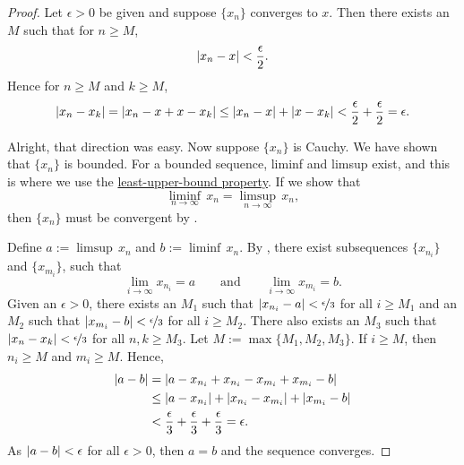 \begin{proof}
Let $\epsilon > 0$ be given and
suppose $\{ x_n \}$ converges to $x$.  Then there 
exists an $M$ such that for $n \geq M$,
\begin{equation*}
\left\lvert {x_n - x} \right\rvert < \frac{\epsilon}{2} .
\end{equation*}
Hence for $n \geq M$ and $k \geq M$,
\begin{equation*}
\left\lvert {x_n - x_k} \right\rvert = 
\left\lvert {x_n - x + x - x_k} \right\rvert
\leq \left\lvert {x_n-x} \right\rvert + \left\lvert {x-x_k} \right\rvert < \frac{\epsilon}{2} + \frac{\epsilon}{2} =
\epsilon .
\end{equation*}

Alright, that direction was easy.  Now suppose $\{ x_n \}$ is Cauchy.
We have shown that $\{ x_n \}$ is bounded.
For a bounded sequence, liminf and limsup exist, and this is
where we use the
\hyperref[defn:lub]{least-upper-bound property}.
If we show that
\begin{equation*}
\liminf_{n\to \infty} \, x_n = \limsup_{n\to\infty} \, x_n ,
\end{equation*}
then $\{ x_n \}$ must be convergent by .


Define $a := \limsup \, x_n$ and
$b := \liminf \, x_n$.
By , there exist subsequences
$\{ x_{n_i} \}$ and
$\{ x_{m_i} \}$, such that
\begin{equation*}
\lim_{i\to\infty} x_{n_i} = a
\qquad \text{and} \qquad
\lim_{i\to\infty} x_{m_i} = b.
\end{equation*}
Given an $\epsilon > 0$,
there exists an $M_1$ such that
$\left\lvert {x_{n_i} - a} \right\rvert < \nicefrac{\epsilon}{3}$ for all $i \geq M_1$
and an $M_2$ such that
$\left\lvert {x_{m_i} - b} \right\rvert < \nicefrac{\epsilon}{3}$ for all $i \geq M_2$.
There also exists an $M_3$
such that
$\left\lvert {x_n-x_k} \right\rvert < \nicefrac{\epsilon}{3}$
for all $n,k \geq M_3$.
Let $M := \max \{ M_1, M_2, M_3 \}$.
If $i \geq M$, then $n_i \geq M$ and $m_i \geq M$.  Hence,
\begin{equation*}
\begin{split}
\left\lvert {a-b} \right\rvert & =
\left\lvert {a-x_{n_i}+x_{n_i}
-x_{m_i}+x_{m_i}
-b} \right\rvert \\
& \leq
\left\lvert {a-x_{n_i}} \right\rvert
+ \left\lvert {x_{n_i} -x_{m_i}} \right\rvert
+ \left\lvert {x_{m_i} -b} \right\rvert \\
& <
\frac{\epsilon}{3}
+
\frac{\epsilon}{3}
+
\frac{\epsilon}{3}
= \epsilon .
\end{split}
\end{equation*}
As $\left\lvert {a-b} \right\rvert < \epsilon$ for all $\epsilon > 0$, then $a=b$ and 
the sequence converges.
\end{proof}

